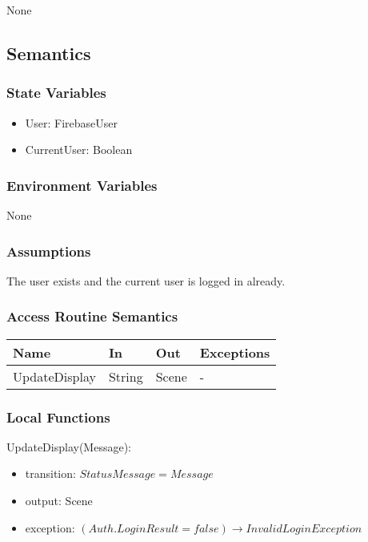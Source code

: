 \documentclass[12pt, titlepage]{article}
\begin{document}
None

\subsection{Semantics}

\subsubsection{State Variables}

\begin{itemize}
\item User: FirebaseUser
\item CurrentUser: Boolean
\end{itemize}

\subsubsection{Environment Variables}

None

\subsubsection{Assumptions}

The user exists and the current user is logged in already.

\subsubsection{Access Routine Semantics}

\begin{center}
	\begin{tabular}{p{4cm} p{2cm} p{4cm} p{4cm}}
	\hline
	\textbf{Name} & \textbf{In} & \textbf{Out} & \textbf{Exceptions} \\
	\hline
	UpdateDisplay & String & Scene & - \\
	\hline
	\end{tabular}
\end{center}

\subsubsection{Local Functions}

\noindent UpdateDisplay(Message):
\begin{itemize}
\item transition: $StatusMessage = Message$ 
\item output: Scene
\item exception: $(Auth.LoginResult = false) \rightarrow InvalidLoginException$
\end{itemize}
\end{document}
